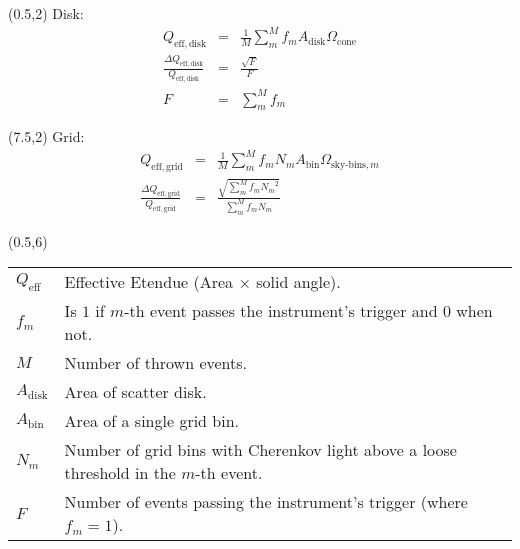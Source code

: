 \documentclass{minimal}
\begin{document}
    \begin{textblock}{7}(0.5,2)
        Disk:
        \begin{eqnarray*}
            Q_\mathrm{eff,disk} &=& \frac{1}{M} \sum_m^M f_m A_\mathrm{disk} \Omega_\mathrm{cone}\\
            \frac{
                \Delta Q_\mathrm{eff,disk}
            }{
                Q_\mathrm{eff,disk}
            }
            &=&
            \frac{
                \sqrt{F}
            }{
                F
            }\\
            F &=& \sum_m^M f_m
        \end{eqnarray*}
    \end{textblock}
    \begin{textblock}{7}(7.5,2)
        Grid:
        \begin{eqnarray*}
            Q_\mathrm{eff,grid} &=& \frac{1}{M} \sum_m^M f_m N_m A_\mathrm{bin} \Omega_{\text{sky-bins},m}\\
            \frac{
                \Delta Q_\mathrm{eff,grid}
            }{
                Q_\mathrm{eff,grid}
            }
            &=&
            \frac{
                \sqrt{\sum_m^M f_m {N_m}^2}
            }{
                \sum_m^M f_m N_m
            }
        \end{eqnarray*}
    \end{textblock}

    \begin{textblock}{14}(0.5,6)
        \begingroup
            \fontsize{8pt}{10pt}\selectfont
            \begin{tabular}{l@{\hskip 0.5cm}l}
            $Q_\mathrm{eff}$ & Effective Etendue (Area $\times$ solid angle).\\
            $f_m$ & Is $1$ if $m$-th event passes the instrument's trigger and $0$ when not.\\
            $M$ & Number of thrown events. \\
            $A_\mathrm{disk}$ & Area of scatter disk.\\
            $A_\mathrm{bin}$ & Area of a single grid bin.\\
            $N_m$ & Number of grid bins with Cherenkov light above a loose threshold in the $m$-th event.\\
            $F$ & Number of events passing the instrument's trigger (where $f_m = 1$).\\
            \end{tabular}
        \endgroup
    \end{textblock}
\end{document}

